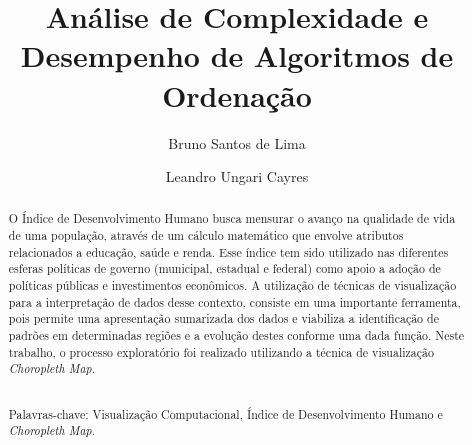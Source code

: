 \documentclass[conference]{IEEEtran}
\begin{document}
\renewcommand{\abstractname}{Resumo}
\renewcommand{\refname}{REFERÊNCIAS}
\renewcommand{\tablename}{TABELA}


\title{Análise de Complexidade e Desempenho de Algoritmos de Ordenação}



\author{ 
 Bruno Santos de Lima\\ 
 \and 
 Leandro Ungari Cayres\\ 
} 



\maketitle

\begin{abstract}

O Índice de Desenvolvimento Humano busca mensurar o avanço na qualidade de vida de uma população, através de um cálculo matemático que envolve atributos relacionados a educação, saúde e renda. Esse índice tem sido utilizado nas diferentes esferas políticas de governo (municipal, estadual e federal) como apoio a adoção de políticas públicas e investimentos econômicos. A utilização de técnicas de visualização para a interpretação de dados desse contexto, consiste em uma importante ferramenta, pois permite uma apresentação sumarizada dos dados e viabiliza a identificação de padrões em determinadas regiões e a evolução destes conforme uma dada função. Neste trabalho, o processo exploratório foi realizado utilizando a técnica de visualização \textit{Choropleth Map}.

~\\Palavras-chave: Visualização Computacional, Índice de Desenvolvimento Humano e \textit{Choropleth Map}.

\end{abstract}
\end{document}
